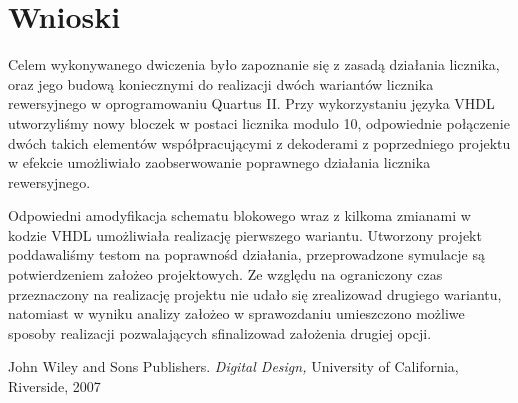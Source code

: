 \documentclass{classrep}
\begin{document}
\section{Wnioski}

Celem wykonywanego dwiczenia było zapoznanie się z zasadą działania licznika, oraz jego budową
koniecznymi do realizacji dwóch wariantów licznika rewersyjnego w oprogramowaniu Quartus II. Przy
wykorzystaniu języka VHDL utworzyliśmy nowy bloczek w postaci licznika modulo 10, odpowiednie
połączenie dwóch takich elementów współpracującymi z dekoderami z poprzedniego projektu w
efekcie umożliwiało zaobserwowanie poprawnego działania licznika rewersyjnego.

Odpowiedni amodyfikacja schematu blokowego wraz z kilkoma zmianami w kodzie VHDL umożliwiała realizację
pierwszego wariantu. Utworzony projekt poddawaliśmy testom na poprawnośd działania,
przeprowadzone symulacje są potwierdzeniem założeo projektowych. Ze względu na ograniczony
czas przeznaczony na realizację projektu nie udało się zrealizowad drugiego wariantu, natomiast w
wyniku analizy założeo w sprawozdaniu umieszczono możliwe sposoby realizacji pozwalających
sfinalizowad założenia drugiej opcji.



\begin{thebibliography}{0}
   John Wiley and Sons Publishers.
    \textsl{Digital Design,} University of California, Riverside, 2007
\end{thebibliography}
\end{document}
